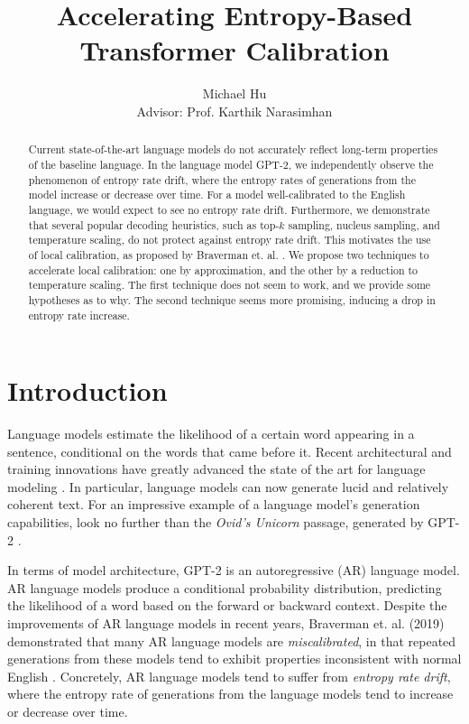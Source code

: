 \documentclass[pageno]{jpaper}
\begin{document}
\title{Accelerating Entropy-Based Transformer Calibration}

\author{Michael Hu \\Advisor: Prof. Karthik Narasimhan}

\date{}
\maketitle

\thispagestyle{empty}
\doublespacing
\begin{abstract}

Current state-of-the-art language models do not accurately reflect long-term properties of the baseline language. In the language model GPT-2, we independently observe the phenomenon of entropy rate drift, where the entropy rates of generations from the model increase or decrease over time. For a model well-calibrated to the English language, we would expect to see no entropy rate drift. Furthermore, we demonstrate that several popular decoding heuristics, such as top-$k$ sampling, nucleus sampling, and temperature scaling, do not protect against entropy rate drift. This motivates the use of local calibration, as proposed by Braverman et. al. \cite{Braverman}. We propose two techniques to accelerate local calibration: one by approximation, and the other by a reduction to temperature scaling. The first technique does not seem to work, and we provide some hypotheses as to why. The second technique seems more promising, inducing a drop in entropy rate increase.

\end{abstract}

\section{Introduction}

Language models estimate the likelihood of a certain word appearing in a sentence, conditional on the words that came before it. Recent architectural and training innovations have greatly advanced the state of the art for language modeling \cite{Radford2018ImprovingLU,BERT,XLNet}. In particular, language models can now generate lucid and relatively coherent text. For an impressive example of a language model's generation capabilities, look no further than the \textit{Ovid's Unicorn} passage, generated by GPT-2 \cite{radford2019language}.

In terms of model architecture, GPT-2 is an autoregressive (AR) language model. AR language models produce a conditional probability distribution, predicting the likelihood of a word based on the forward or backward context. Despite the improvements of AR language models in recent years, Braverman et. al. (2019) demonstrated that many AR language models are \textit{miscalibrated}, in that repeated generations from these models tend to exhibit properties inconsistent with normal English \cite{Braverman}. Concretely, AR language models tend to suffer from \textit{entropy rate drift}, where the entropy rate of generations from the language models tend to increase or decrease over time.
\end{document}
